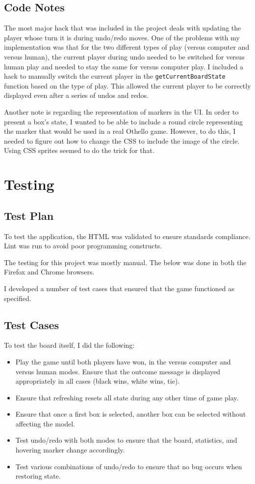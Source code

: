 \documentclass[11pt,letterpaper]{article}
\begin{document}
\subsection{Code Notes}
The most major hack that was included in the project deals with updating the player whose turn it is during undo/redo moves. One of the problems with my implementation was that for the two different types of play (versus computer and versus human), the current player during undo needed to be switched for versus human play and needed to stay the same for versus computer play. I included a hack to manually switch the current player in the \texttt{getCurrentBoardState} function based on the type of play. This allowed the current player to be correctly displayed even after a series of undos and redos.

Another note is regarding the representation of markers in the UI. In order to present a box's state, I wanted to be able to include a round circle representing the marker that would be used in a real Othello game. However, to do this, I needed to figure out how to change the CSS to include the image of the circle. Using CSS sprites seemed to do the trick for that.
\section{Testing}

\subsection{Test Plan}
To test the application, the HTML was validated to ensure standards compliance. Lint was run to avoid poor programming constructs.

The testing for this project was mostly manual. The below was done in both the Firefox and Chrome browsers.

I developed a number of test cases that ensured that the game functioned as specified.

\subsection{Test Cases}
To test the board itself, I did the following:
\begin{itemize}
\item Play the game until both players have won, in the versus computer and versus human modes. Ensure that the outcome message is displayed appropriately in all cases (black wins, white wins, tie).
\item Ensure that refreshing resets all state during any other time of game play.
\item Ensure that once a first box is selected, another box can be selected without affecting the model.
\item Test undo/redo with both modes to ensure that the board, statistics, and hovering marker change accordingly.
\item Test various combinations of undo/redo to ensure that no bug occurs when restoring state.
\end{itemize}
\end{document}
